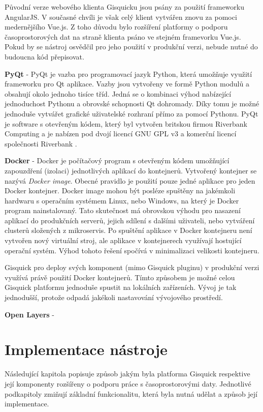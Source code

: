Původní verze webového klienta Gisquicku jsou psány za použití frameworku AngularJS. V současné chvíli je však celý klient vytvářen znovu za pomoci medernějšího Vue.js. Z toho důvodu bylo rozšíření platformy o podporu časoprostorových dat na straně klienta psáno ve stejném framevorku Vue.js. Pokud by se nástroj osvědčil pro jeho použití v produkční verzi, nebude nutné do budoucna kód přepisovat.

\newpage
\bigskip
\noindent
\textbf{PyQt} - PyQt je vazba pro programovací jazyk Python, která umožňuje využití frameworku pro Qt aplikace. Vazby jsou vytvořeny ve formě Python modulů a obsahují okolo jednoho tisíce tříd. Jedná se o kombinaci výhod nabízející jednoduchost Pythonu a obrovské schopnosti Qt dohromady. Díky tomu je možné jednoduše vytvářet grafické uživatelské rozhraní přímo za pomocí Pythonu. PyQt je software s otevřeným kódem, který byl vytvořen britskou firmou Riverbank Computing a je nabízen pod dvojí licencí GNU GPL v3 a komerční licencí společnosti Riverbank \cite{pyqt}.

\bigskip
\noindent
\textbf{Docker} - Docker je počítačový program s otevřeným kódem umožňující zapouzdření (izolaci) jednotlivých aplikací do kontejnerů. Vytvořený kontejner se nazývá \textit{Docker image}. Obecné pravidlo je použití pouze jedné aplikace pro jeden Docker kontejner. Docker image mohou být posléze spuštěny na jakémkoli hardwaru s operačním systémem Linux, nebo Windows, na který je Docker program nainstalovaný. Tato skutečnost má obrovskou výhodu pro nasazení aplikací do produkčních serverů, jejich sdílení s dalšími uživateli, nebo vytváření clusterů složených z mikroservis. Po spuštění aplikace v Docker kontejneru není vytvořen nový virtuální stroj, ale aplikace v kontejnerech využívají hostující operační systém. Výhod tohoto řešení spočívá v minimalizaci velikosti kontejneru.

Gisquick pro deploy svých komponent (mimo Gisquick pluginu) v produkční verzi využívá právě použití Docker kontejnerů. Tímto způsobem je možné celou Gisquick platformu jednoduše spustit na lokálních zařízeních. Vývoj je tak jednodušší, protože odpadá jakékoli nastavování vývojového prostředí. 

\bigskip
\noindent
\textbf{Open Layers} - 

\newpage
\section{Implementace nástroje}

Následující kapitola popisuje způsob jakým byla platforma Gisquick respektive její komponenty rozšířeny o podporu práce s časoprostorovými daty. Jednotlivé podkapitoly zmiňují základní funkcionalitu, která byla nutná udělat a způsob její implementace.

